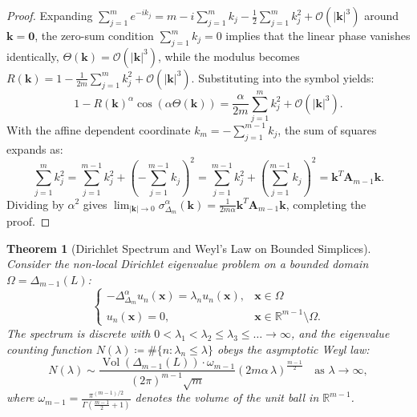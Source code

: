 \documentclass[11pt,a4paper]{article}
\theoremstyle{plain}
\newtheorem{theorem}{Theorem}[section]
\theoremstyle{definition}
\theoremstyle{remark}
\numberwithin{equation}{section}
\begin{document}
\begin{proof}
Expanding $\sum_{j=1}^m e^{-ik_j} = m - i\sum_{j=1}^m k_j - \frac{1}{2}\sum_{j=1}^m k_j^2 + \mathcal{O}(|\mathbf{k}|^3)$ around $\mathbf{k} = \mathbf{0}$, the zero-sum condition $\sum_{j=1}^m k_j = 0$ implies that the linear phase vanishes identically, $\Theta(\mathbf{k}) = \mathcal{O}(|\mathbf{k}|^3)$, while the modulus becomes $R(\mathbf{k}) = 1 - \frac{1}{2m}\sum_{j=1}^m k_j^2 + \mathcal{O}(|\mathbf{k}|^3)$. Substituting into the symbol yields:
\begin{equation}
1 - R(\mathbf{k})^\alpha\cos(\alpha\Theta(\mathbf{k})) = \frac{\alpha}{2m}\sum_{j=1}^m k_j^2 + \mathcal{O}(|\mathbf{k}|^3).
\end{equation}
With the affine dependent coordinate $k_m = -\sum_{j=1}^{m-1} k_j$, the sum of squares expands as:
\begin{equation}
\sum_{j=1}^m k_j^2 = \sum_{j=1}^{m-1} k_j^2 + \left(-\sum_{j=1}^{m-1} k_j\right)^2 = \sum_{j=1}^{m-1} k_j^2 + \left(\sum_{j=1}^{m-1} k_j\right)^2 = \mathbf{k}^T \mathbf{A}_{m-1}\mathbf{k}.
\end{equation}
Dividing by $\alpha^2$ gives $\lim_{|\mathbf{k}| \to 0} \sigma_{\Delta_m}^\alpha(\mathbf{k}) = \frac{1}{2m\alpha}\mathbf{k}^T \mathbf{A}_{m-1}\mathbf{k}$, completing the proof.
\end{proof}

\begin{theorem}[Dirichlet Spectrum and Weyl's Law on Bounded Simplices]
Consider the non-local Dirichlet eigenvalue problem on a bounded domain $\Omega = \Delta_{m-1}(L)$:
\begin{equation}
\begin{cases}
-\Delta_{\Delta_m}^\alpha u_n(\mathbf{x}) = \lambda_n u_n(\mathbf{x}), & \mathbf{x} \in \Omega \\
u_n(\mathbf{x}) = 0, & \mathbf{x} \in \mathbb{R}^{m-1} \setminus \Omega.
\end{cases}
\end{equation}
The spectrum is discrete with $0 < \lambda_1 < \lambda_2 \le \lambda_3 \le \dots \to \infty$, and the eigenvalue counting function $N(\lambda) \coloneqq \#\{n : \lambda_n \le \lambda\}$ obeys the asymptotic Weyl law:
\begin{equation}
N(\lambda) \sim \frac{\operatorname{Vol}(\Delta_{m-1}(L)) \cdot \omega_{m-1}}{(2\pi)^{m-1}\sqrt{m}}\left(2m\alpha\,\lambda\right)^{\frac{m-1}{2}} \quad \text{as } \lambda \to \infty,
\end{equation}
where $\omega_{m-1} = \frac{\pi^{(m-1)/2}}{\Gamma(\frac{m-1}{2}+1)}$ denotes the volume of the unit ball in $\mathbb{R}^{m-1}$.
\end{theorem}
\end{document}
